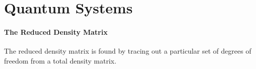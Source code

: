 \section{Quantum Systems}

\paragraph{The Reduced Density Matrix}
The reduced density matrix is found by tracing out a particular set of degrees of freedom from a total density matrix.